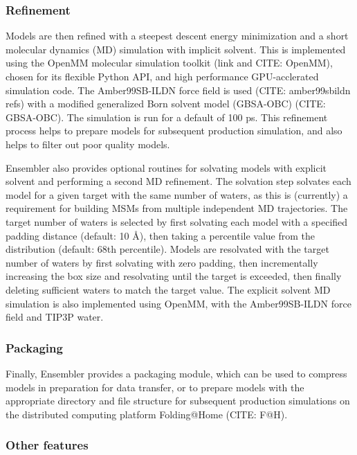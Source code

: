 \documentclass[aps,pre,twocolumn,nofootinbib,superscriptaddress,linenumbers]{revtex4-1}
\begin{document}
\subsubsection{Refinement}

Models are then refined with a steepest descent energy minimization and a short
molecular dynamics (MD) simulation with implicit solvent. This is implemented
using the OpenMM molecular simulation toolkit (link and CITE: OpenMM), chosen
for its flexible Python API, and high performance GPU-acclerated simulation
code. The Amber99SB-ILDN force field is used (CITE: amber99sbildn refs) with a
modified generalized Born solvent model (GBSA-OBC) (CITE: GBSA-OBC). The
simulation is run for a default of 100 ps. This refinement process helps to
prepare models for subsequent production simulation, and also helps to filter
out poor quality models.

Ensembler also provides optional routines for solvating models with explicit
solvent and performing a second MD refinement. The solvation step solvates each
model for a given target with the same number of waters, as this is (currently)
a requirement for building MSMs from multiple independent MD trajectories. The
target number of waters is selected by first solvating each model with a
specified padding distance (default: 10 \AA), then taking a percentile value
from the distribution (default: 68th percentile). Models are resolvated with
the target number of waters by first solvating with zero padding, then
incrementally increasing the box size and resolvating until the target is
exceeded, then finally deleting sufficient waters to match the target value.
The explicit solvent MD simulation is also implemented using OpenMM, with the
Amber99SB-ILDN force field and TIP3P water.

\subsubsection{Packaging}

Finally, Ensembler provides a packaging module, which can be used to compress
models in preparation for data transfer, or to prepare models with the
appropriate directory and file structure for subsequent production simulations
on the distributed computing platform Folding@Home (CITE: F@H).

\subsubsection{Other features}
\end{document}
